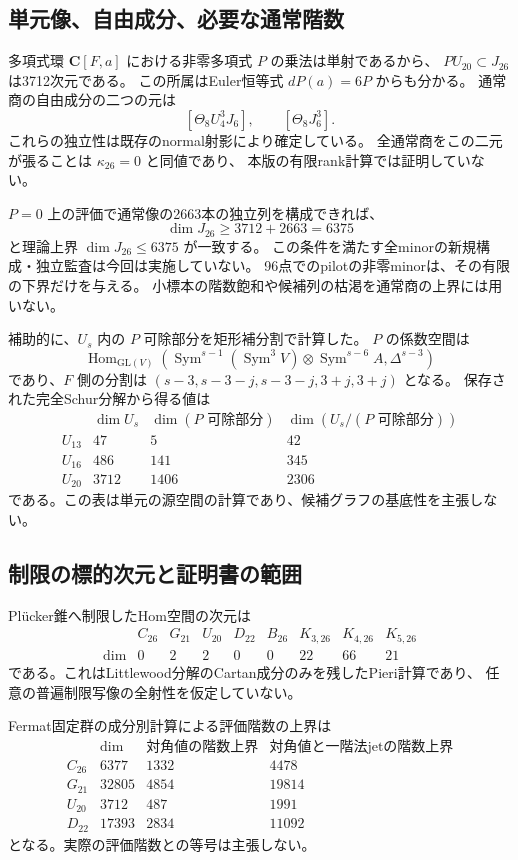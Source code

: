 \documentclass[a4paper,11pt]{ltjsarticle}
\theoremstyle{definition}
\begin{document}
\subsection{単元像、自由成分、必要な通常階数}

多項式環 $\mathbf C[F,a]$ における非零多項式 $P$ の乗法は単射であるから、
$PU_{20}\subset J_{26}$ は3712次元である。
この所属はEuler恒等式 $dP(a)=6P$ からも分かる。
通常商の自由成分の二つの元は
\[
 [\Theta_8U_4^3J_6],\qquad [\Theta_8J_6^3].
\]
これらの独立性は既存のnormal射影により確定している。
全通常商をこの二元が張ることは $\kappa_{26}=0$ と同値であり、
本版の有限rank計算では証明していない。

$P=0$ 上の評価で通常像の2663本の独立列を構成できれば、
\[
 \dim J_{26}\geq3712+2663=6375
\]
と理論上界 $\dim J_{26}\leq6375$ が一致する。
この条件を満たす全minorの新規構成・独立監査は今回は実施していない。
96点でのpilotの非零minorは、その有限の下界だけを与える。
小標本の階数飽和や候補列の枯渇を通常商の上界には用いない。

補助的に、$U_s$ 内の $P$ 可除部分を矩形補分割で計算した。
$P$ の係数空間は
\[
 \operatorname{Hom}_{\mathrm{GL}(V)}
 \left(\operatorname{Sym}^{s-1}(\operatorname{Sym}^3V)
 \otimes\operatorname{Sym}^{s-6}A,\Delta^{s-3}\right)
\]
であり、$F$ 側の分割は
$(s-3,s-3-j,s-3-j,3+j,3+j)$ となる。
保存された完全Schur分解から得る値は
\[
\begin{array}{c|r|r|r}
 &\dim U_s&\dim(P\text{ 可除部分})&\dim(U_s/(P\text{ 可除部分}))\\\hline
U_{13}&47&5&42\\
U_{16}&486&141&345\\
U_{20}&3712&1406&2306
\end{array}
\]
である。この表は単元の源空間の計算であり、候補グラフの基底性を主張しない。

\subsection{制限の標的次元と証明書の範囲}

Pl\"ucker錐へ制限したHom空間の次元は
\[
\begin{array}{c|rrrrrrrr}
 &C_{26}&G_{21}&U_{20}&D_{22}&B_{26}&K_{3,26}&K_{4,26}&K_{5,26}\\\hline
\dim&0&2&2&0&0&22&66&21
\end{array}
\]
である。これはLittlewood分解のCartan成分のみを残したPieri計算であり、
任意の普遍制限写像の全射性を仮定していない。

Fermat固定群の成分別計算による評価階数の上界は
\[
\begin{array}{c|r|r|r}
 &\dim&\text{対角値の階数上界}&\text{対角値と一階法jetの階数上界}\\\hline
C_{26}&6377&1332&4478\\
G_{21}&32805&4854&19814\\
U_{20}&3712&487&1991\\
D_{22}&17393&2834&11092
\end{array}
\]
となる。実際の評価階数との等号は主張しない。
\end{document}
